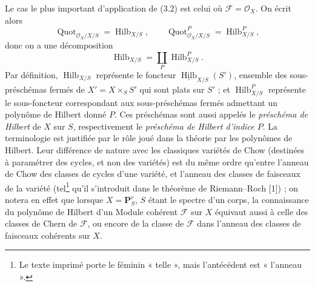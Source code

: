 Le cas le plus important d'application de (3.2) est celui où
$\mathcal F=\mathcal O_X$. On écrit alors
\[
\operatorname{Quot}_{\mathcal O_X/X/S}=\operatorname{Hilb}_{X/S},
\qquad
\operatorname{Quot}^P_{\mathcal O_X/X/S}=\operatorname{Hilb}^P_{X/S},
\]
donc on a une décomposition
\[
\operatorname{Hilb}_{X/S}=\coprod_P\operatorname{Hilb}^P_{X/S}.
\]
Par définition, $\operatorname{Hilb}_{X/S}$ représente le foncteur
$\underline{\operatorname{Hilb}}_{X/S}(S')$, ensemble des sous-préschémas
fermés de $X'=X\times_SS'$ qui sont plats sur $S'$ ; et
$\operatorname{Hilb}^P_{X/S}$ représente le sous-foncteur correspondant aux
sous-préschémas fermés admettant un polynôme de Hilbert donné $P$. Ces
préschémas sont aussi appelés le \emph{préschéma de Hilbert} de $X$ sur $S$,
respectivement le \emph{préschéma de Hilbert d'indice $P$}. La terminologie est
justifiée par le rôle joué dans la théorie par les polynômes de Hilbert. Leur
différence de nature avec les classiques variétés de Chow (destinées à
paramétrer des cycles, et non des variétés) est du même ordre qu'entre
l'anneau de Chow des classes de cycles d'une variété, et l'anneau des classes
de faisceaux de la variété (tel\footnote{Le texte imprimé porte le féminin « telle », mais l'antécédent est « l'anneau ».} qu'il s'introduit dans le théorème de
Riemann--Roch [1]) ; on notera en effet que lorsque $X=\mathbf P^r_S$, $S$
étant le spectre d'un corps, la connaissance du polynôme de Hilbert d'un Module
cohérent $\mathcal F$ sur $X$ équivaut aussi à celle des classes de Chern de
$\mathcal F$, ou encore de la classe de $\mathcal F$ dans l'anneau des classes
de faisceaux cohérents sur $X$.

